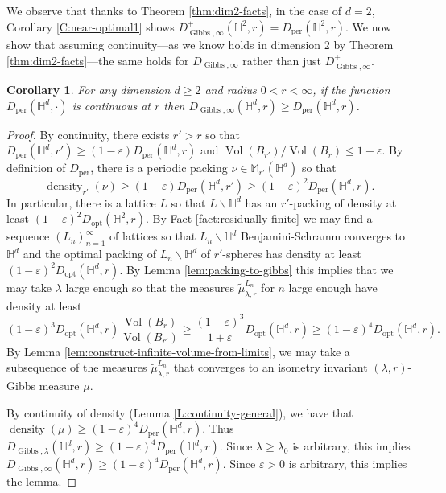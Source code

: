 \documentclass[11pt]{amsart}
\newtheorem{corollary}[theorem]{Corollary}
\theoremstyle{definition}
\theoremstyle{remark}
\renewcommand{\H}{\mathbb{H}}
\newcommand{\M}{\mathbb{M}}
\newcommand{\density}{\operatorname{density}}
\newcommand{\opt}{\operatorname{opt}}
\newcommand{\per}{\operatorname{per}}
\newcommand{\Dopt}{D_{\opt}}
\newcommand{\Vol}{\operatorname{Vol}}
\newcommand{\eps}{\varepsilon}
\newcommand{\Gibbs}{\operatorname{Gibbs}}
\begin{document}
We observe that thanks to Theorem \ref{thm:dim2-facts}, in the case of $d=2$, Corollary \ref{C:near-optimal1} shows $D^+_{\Gibbs,\infty}(\H^2,r) = D_{\per}(\H^2,r)$.  We now show that assuming continuity---as we know holds in dimension $2$ by Theorem \ref{thm:dim2-facts}---the same holds for $D_{\Gibbs,\infty}$ rather than just $D_{\Gibbs,\infty}^+$.


\begin{corollary}\label{C:near-optimal2}
     For any dimension $d\ge 2$ and radius $0<r<\infty$, if the function $D_{\per}(\H^d,\cdot)$ is continuous at $r$ then  $D_{\Gibbs,\infty}(\H^d,r) \ge D_{\per}(\H^d,r)$.
\end{corollary}

\begin{proof}
   By continuity, there exists $r' > r$ so that $D_{\per}(\H^d,r') \geq (1 - \eps)D_{\per}(\H^d,r)$ and $\Vol(B_{r'})/\Vol(B_r) \leq 1 + \eps$.  By definition of $D_{\per}$, there is a periodic packing $\nu \in \M_{r'}(\H^d)$ so that $$\density_{r'}(\nu) \geq (1 - \eps)D_{\per}(\H^d,r') \geq (1 - \eps)^2 D_{\per}(\H^d,r).$$
      In particular, there is a lattice $L$ so that $L \backslash \H^d$ has an $r'$-packing of density at least $(1 - \eps)^2\Dopt(\H^2,r)$.   
   By Fact \ref{fact:residually-finite} we may find a sequence $(L_n)_{n = 1}^\infty$ of lattices so that $L_n \backslash \H^d$ Benjamini-Schramm converges to $\H^d$ and the optimal packing of $L_n \backslash \H^d$ of $r'$-spheres has density at least $(1 - \eps)^2D_{\opt}(\H^d,r).$  By Lemma \ref{lem:packing-to-gibbs} this implies that we may take $\lambda$ large enough so that the measures $\tilde{\mu}^{L_n}_{\lambda,r}$ for $n$ large enough have density at least 
   $$(1 - \eps)^3 D_{\opt}(\H^d,r)\frac{\Vol(B_r)}{\Vol(B_{r'})} \geq  \frac{(1 - \eps)^3}{1+\eps} D_{\opt}(\H^d,r) \geq (1 - \eps)^4D_{\opt}(\H^d,r).$$ 
   By Lemma \ref{lem:construct-infinite-volume-from-limits}, we may take a subsequence of the measures $\tilde{\mu}^{L_n}_{\lambda,r}$ that converges to an isometry invariant $(\lambda,r)$-Gibbs measure $\mu$.
   
   By continuity of density (Lemma \ref{L:continuity-general}), we have that $\density(\mu) \geq (1 - \eps)^4D_{\per}(\H^d,r).$ Thus $D_{\Gibbs,\lambda}(\H^d,r) \ge (1 - \eps)^4D_{\per}(\H^d,r)$. Since $\lambda \ge \lambda_0$ is arbitrary, this implies $D_{\Gibbs,\infty}(\H^d,r) \ge (1 - \eps)^4D_{\per}(\H^d,r)$. Since $\eps>0$ is arbitrary, this implies the lemma.
\end{proof}
\end{document}
